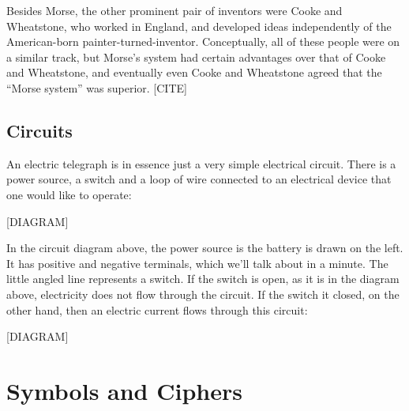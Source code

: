 \documentclass{book}
\begin{document}
Besides Morse, the other prominent pair of inventors were Cooke and Wheatstone, who worked in England, and developed ideas independently of the American-born painter-turned-inventor. Conceptually, all of these people were on a similar track, but Morse's system had certain advantages over that of Cooke and Wheatstone, and eventually even Cooke and Wheatstone agreed that the “Morse system” was superior. [CITE]

\section{Circuits}

An electric telegraph is in essence just a very simple electrical circuit. There is a power source, a switch and a loop of wire connected to an electrical device that one would like to operate:

[DIAGRAM]

In the circuit diagram above, the power source is the battery is drawn on the left. It has positive and negative terminals, which we'll talk about in a minute. The little angled line represents a switch. If the switch is open, as it is in the diagram above, electricity does not flow through the circuit. If the switch it closed, on the other hand, then an electric current flows through this circuit:

[DIAGRAM]


\chapter{Symbols and Ciphers}
\end{document}
